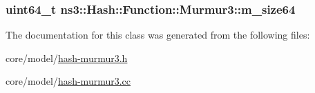\subsubsection[{\texorpdfstring{m\+\_\+size64}{m_size64}}]{\setlength{\rightskip}{0pt plus 5cm}uint64\+\_\+t ns3\+::\+Hash\+::\+Function\+::\+Murmur3\+::m\+\_\+size64\hspace{0.3cm}{\ttfamily [private]}}\hypertarget{classns3_1_1Hash_1_1Function_1_1Murmur3_adb1bc6a1101d226afbc439b987b423c1}{}\label{classns3_1_1Hash_1_1Function_1_1Murmur3_adb1bc6a1101d226afbc439b987b423c1}


The documentation for this class was generated from the following files\+:\begin{DoxyCompactItemize}
\item 
core/model/\hyperlink{hash-murmur3_8h}{hash-\/murmur3.\+h}\item 
core/model/\hyperlink{hash-murmur3_8cc}{hash-\/murmur3.\+cc}\end{DoxyCompactItemize}
